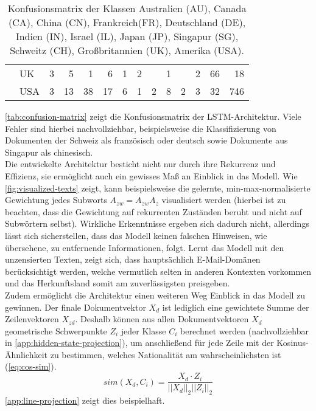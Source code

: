 \documentclass[bachelor,german]{info1thesis}
\begin{document}
\begin{table}[]
\begin{tabular}{@{}clrrrrrrrrrrrr@{}}
                           & UK  & 3  & 5  & 1   & 6  & 1  & 2  &    & 1  &    & 2  & 66 & 18  \\
                           & USA & 3  & 13 & 38  & 17 & 6  & 1  & 2  & 8  & 2  & 3  & 32 & 746 \\ \cmidrule(l){2-14} 
\end{tabular}
\caption{Konfusionsmatrix der Klassen Australien (AU), Canada (CA), China (CN), Frankreich(FR), Deutschland (DE), Indien (IN), Israel (IL), Japan (JP), Singapur (SG), Schweitz (CH), Großbritannien (UK), Amerika (USA).}
\label{tab:confusion-matrix}
\end{table}
%
\noindent\autoref{tab:confusion-matrix} zeigt die Konfusionsmatrix der LSTM-Architektur. Viele Fehler sind hierbei nachvollziehbar, beispielsweise die Klassifizierung von Dokumenten der Schweiz als französisch oder deutsch sowie Dokumente aus Singapur als chinesisch. \\
Die entwickelte Architektur besticht nicht nur durch ihre Rekurrenz und Effizienz, sie ermöglicht auch ein gewisses Maß an Einblick in das Modell. Wie \autoref{fig:visualized-texts} zeigt, kann beispielsweise die gelernte, min-max-normalisierte Gewichtung jedes Subworts $A_{zw} = A_{zw}A_{z}$ visualisiert werden (hierbei ist zu beachten, dass die Gewichtung auf rekurrenten Zuständen beruht und nicht auf Subwörtern selbst). Wirkliche Erkenntnisse ergeben sich dadurch nicht, allerdings lässt sich sicherstellen, dass das Modell keinen falschen Hinweisen, wie übersehene, zu entfernende Informationen, folgt. Lernt das Modell mit den unzensierten Texten, zeigt sich, dass hauptsächlich E-Mail-Domänen berücksichtigt werden, welche vermutlich selten in anderen Kontexten vorkommen und das Herkunftsland somit am zuverlässigsten preisgeben. \\
%
%
%
%
Zudem ermöglicht die Architektur einen weiteren Weg Einblick in das Modell zu gewinnen. Der finale Dokumentvektor $X_d$ ist lediglich eine gewichtete Summe der Zeilenvektoren $X_{zd}$. Deshalb können aus allen Dokumentvektoren $X_d$ geometrische Schwerpunkte $Z_i$ jeder Klasse $C_i$ berechnet werden (nachvollziehbar in \autoref{app:hidden-state-projection}), um anschließend für jede Zeile mit der Kosinus-Ähnlichkeit zu bestimmen, welches Nationalität am wahrscheinlichsten ist (\autoref{eq:cos-sim}).
\begin{equation}
sim(X_d, C_i) = \frac{X_d \cdot Z_i}{||X_d||_2||Z_i||_2} \label{eq:cos-sim}
\end{equation}
\autoref{app:line-projection} zeigt dies beispielhaft.
\end{document}
